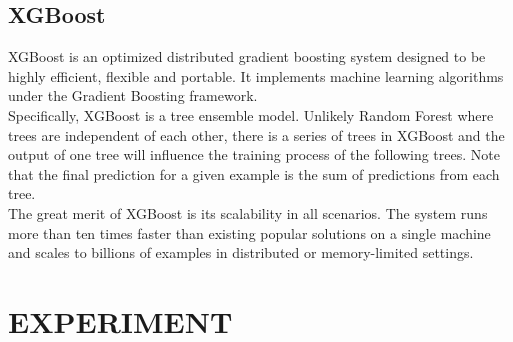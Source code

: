\documentclass[10pt, conference, compsocconf]{IEEEtran}
\begin{document}
\subsection{XGBoost}
XGBoost is an optimized distributed gradient boosting system designed to be highly efficient, flexible and portable. It implements machine learning algorithms under the Gradient Boosting framework. \\
Specifically, XGBoost is a tree ensemble model. Unlikely Random Forest where trees are independent of each other, there is a series of trees in XGBoost and the output of one tree will influence the training process of the following 
trees. Note that the final prediction for a given example is the sum of predictions from each tree.\\
The great merit of XGBoost is its scalability in all scenarios. The system runs more than ten times faster than existing popular solutions on a single machine and scales to billions of examples in distributed or memory-limited settings.\\

\section{EXPERIMENT}
\end{document}
